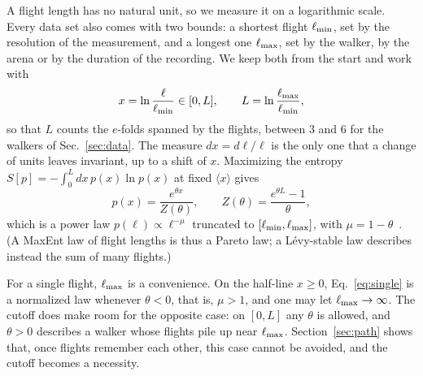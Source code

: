 A flight length has no natural unit, so we measure it on a logarithmic scale. Every data set also comes with two bounds: a shortest flight $\ell_{\min}$, set by the resolution of the measurement, and a longest one $\ell_{\max}$, set by the walker, by the arena or by the duration of the recording. We keep both from the start and work with
\begin{equation}
x=\ln\frac{\ell}{\ell_{\min}}\in[0,L],\qquad L=\ln\frac{\ell_{\max}}{\ell_{\min}},
\label{eq:x}
\end{equation}
so that $L$ counts the $e$-folds spanned by the flights, between 3 and 6 for the walkers of Sec.~\ref{sec:data}. The measure $dx=d\ell/\ell$ is the only one that a change of units leaves invariant, up to a shift of $x$. Maximizing the entropy $S[p]=-\int_0^Ldx\,p(x)\ln p(x)$ at fixed $\langle x\rangle$ gives
\begin{equation}
p(x)=\frac{e^{\theta x}}{Z(\theta)},\qquad Z(\theta)=\frac{e^{\theta L}-1}{\theta},
\label{eq:single}
\end{equation}
which is a power law $p(\ell)\propto\ell^{-\mu}$ truncated to $[\ell_{\min},\ell_{\max}]$, with $\mu=1-\theta$~\cite{Montroll1983}. (A MaxEnt law of flight lengths is thus a Pareto law; a L\'evy-stable law describes instead the sum of many flights.)

For a single flight, $\ell_{\max}$ is a convenience. On the half-line $x\ge0$, Eq.~\eqref{eq:single} is a normalized law whenever $\theta<0$, that is, $\mu>1$, and one may let $\ell_{\max}\to\infty$. The cutoff does make room for the opposite case: on $[0,L]$ any $\theta$ is allowed, and $\theta>0$ describes a walker whose flights pile up near $\ell_{\max}$. Section~\ref{sec:path} shows that, once flights remember each other, this case cannot be avoided, and the cutoff becomes a necessity.

